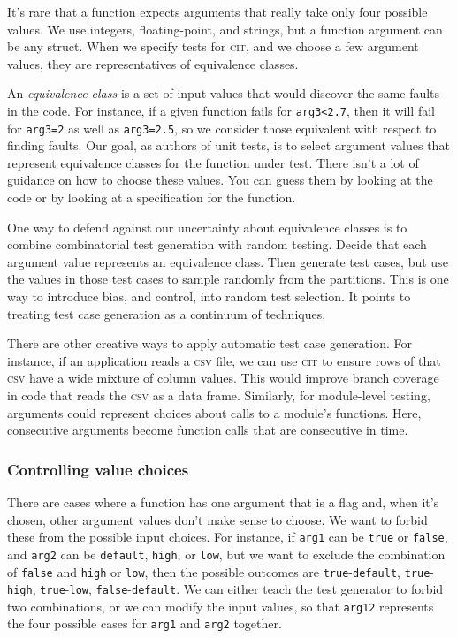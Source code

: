 \documentclass{juliacon}
\newcommand{\cit}{\textsc{cit}\xspace}
\begin{document}
\vskip 6pt
It's rare that a function expects arguments that really take only four possible values. We use integers, floating-point, and strings, but a function argument can be any struct. When we specify tests for \cit, and we choose a few argument values, they are representatives of equivalence classes.

\vskip 6pt
An \emph{equivalence class} is a set of input values that would discover the same faults in the code. For instance, if a given function fails for \verb|arg3<2.7|, then it will fail for \verb|arg3=2| as well as \verb|arg3=2.5|, so we consider those equivalent with respect to finding faults. Our goal, as authors of unit tests, is to select argument values that represent equivalence classes for the function under test. There isn't a lot of guidance on how to choose these values. You can guess them by looking at the code or by looking at a specification for the function.

\vskip 6pt
One way to defend against our uncertainty about equivalence classes is to combine combinatorial test generation with random testing. Decide that each argument value represents an equivalence class. Then generate test cases, but use the values in those test cases to sample randomly from the partitions. This is one way to introduce bias, and control, into random test selection. It points to treating test case generation as a continuum of techniques.

\vskip 6pt
There are other creative ways to apply automatic test case generation. For instance, if an application reads a \textsc{csv} file, we can use \cit to ensure rows of that \textsc{csv} have a wide mixture of column values. This would improve branch coverage in code that reads the \textsc{csv} as a data frame. Similarly, for module-level testing, arguments could represent choices about calls to a module's functions. Here, consecutive arguments become function calls that are consecutive in time.


\subsubsection{Controlling value choices}

There are cases where a function has one argument that is a flag and, when it's chosen, other argument values don't make sense to choose. We want to forbid these from the possible input choices. For instance, if \verb|arg1| can be \verb|true| or \verb|false|, and \verb|arg2| can be \verb|default|, \verb|high|, or \verb|low|, but we want to exclude the combination of \verb|false| and \verb|high| or \verb|low|, then the possible outcomes are \verb|true|-\verb|default|, \verb|true|-\verb|high|, \verb|true|-\verb|low|, \verb|false|-\verb|default|. We can either teach the test generator to forbid two combinations, or we can modify the input values, so that \verb|arg12| represents the four possible cases for \verb|arg1| and \verb|arg2| together.
\end{document}
